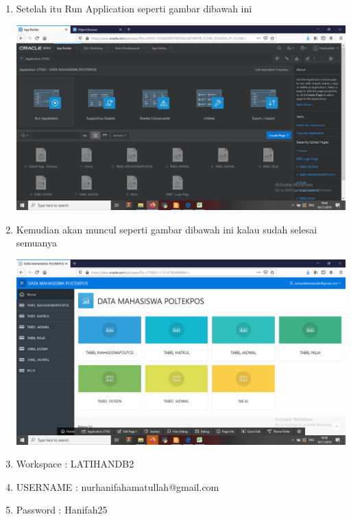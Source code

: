 \begin{enumerate}
     \item Setelah itu Run Application seperti gambar dibawah ini
	\begin{center}
    \includegraphics[scale=0.2]{Apex/74.png}
    \end{center}
    
     \item Kemudian akan muncul seperti gambar dibawah ini kalau sudah selesai semuanya
	\begin{center}
    \includegraphics[scale=0.2]{Apex/76.png}
    \end{center}
    
    \item Workspace : LATIHANDB2
    \item USERNAME : nurhanifahamatullah@gmail.com
    \item Password : Hanifah25
     
     

\end{enumerate}
